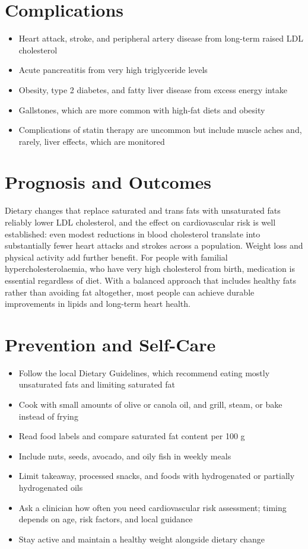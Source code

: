 \section*{Complications}
\begin{itemize}
    \item Heart attack, stroke, and peripheral artery disease from long-term raised LDL cholesterol
    \item Acute pancreatitis from very high triglyceride levels
    \item Obesity, type 2 diabetes, and fatty liver disease from excess energy intake
    \item Gallstones, which are more common with high-fat diets and obesity
    \item Complications of statin therapy are uncommon but include muscle aches and, rarely, liver effects, which are monitored
\end{itemize}

\section*{Prognosis and Outcomes}
Dietary changes that replace saturated and trans fats with unsaturated fats reliably lower LDL cholesterol, and the effect on cardiovascular risk is well established: even modest reductions in blood cholesterol translate into substantially fewer heart attacks and strokes across a population. Weight loss and physical activity add further benefit. For people with familial hypercholesterolaemia, who have very high cholesterol from birth, medication is essential regardless of diet. With a balanced approach that includes healthy fats rather than avoiding fat altogether, most people can achieve durable improvements in lipids and long-term heart health.

\section*{Prevention and Self-Care}
\begin{itemize}
    \item Follow the local Dietary Guidelines, which recommend eating mostly unsaturated fats and limiting saturated fat
    \item Cook with small amounts of olive or canola oil, and grill, steam, or bake instead of frying
    \item Read food labels and compare saturated fat content per 100 g
    \item Include nuts, seeds, avocado, and oily fish in weekly meals
    \item Limit takeaway, processed snacks, and foods with hydrogenated or partially hydrogenated oils
    \item Ask a clinician how often you need cardiovascular risk assessment; timing depends on age, risk factors, and local guidance
    \item Stay active and maintain a healthy weight alongside dietary change
\end{itemize}

